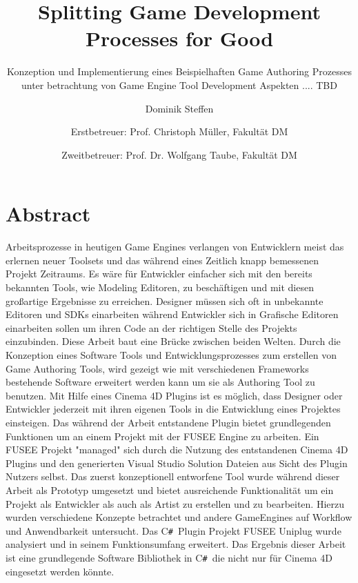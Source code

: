 \documentclass[pagesize, paper=a4, fontsize=12pt,titlepage=true, headings=small, headnosepline, abstractoff, liststotoc, nochapterprefix, plainheadsepline, twoside]{scrreprt}
\author{
Dominik Steffen \and
Erstbetreuer: Prof. Christoph Müller, Fakultät DM \and
Zweitbetreuer: Prof. Dr. Wolfgang Taube, Fakultät DM
}
\title{Splitting Game Development Processes for Good}
\subtitle{Konzeption und Implementierung eines Beispielhaften Game Authoring Prozesses unter betrachtung von Game Engine Tool Development Aspekten .... TBD}
\newcommand{\CSS}{C\texttt{\# }}
\begin{document}



\newpage
\thispagestyle{empty}
\mbox{}

\begingroup
\newpage
\pagestyle{empty}
\renewcommand*{\chapterpagestyle}{empty}
\chapter*{Abstract}%
Arbeitsprozesse in heutigen Game Engines verlangen von Entwicklern meist das erlernen neuer Toolsets und das während eines Zeitlich knapp bemessenen Projekt Zeitraums. Es wäre für Entwickler einfacher sich mit den bereits bekannten Tools, wie Modeling Editoren, zu beschäftigen und mit diesen großartige Ergebnisse zu erreichen. Designer müssen sich oft in unbekannte Editoren und SDKs einarbeiten während Entwickler sich in Grafische Editoren einarbeiten sollen um ihren Code an der richtigen Stelle des Projekts einzubinden.
Diese Arbeit baut eine Brücke zwischen beiden Welten. Durch die Konzeption eines Software Tools und Entwicklungsprozesses zum erstellen von Game Authoring Tools, wird gezeigt wie mit verschiedenen Frameworks bestehende Software erweitert werden kann um sie als Authoring Tool zu benutzen. Mit Hilfe eines Cinema 4D Plugins ist es möglich, dass Designer oder Entwickler jederzeit mit ihren eigenen Tools in die Entwicklung eines Projektes einsteigen. Das während der Arbeit entstandene Plugin bietet grundlegenden Funktionen um an einem Projekt mit der FUSEE Engine zu arbeiten. Ein FUSEE Projekt "managed" sich durch die Nutzung des entstandenen Cinema 4D Plugins und den generierten Visual Studio Solution Dateien aus Sicht des Plugin Nutzers selbst.
Das zuerst konzeptionell entworfene Tool wurde während dieser Arbeit als Prototyp umgesetzt und bietet ausreichende Funktionalität um ein Projekt als Entwickler als auch als Artist zu erstellen und zu bearbeiten. Hierzu wurden verschiedene Konzepte betrachtet und andere GameEngines auf Workflow und Anwendbarkeit untersucht. Das \CSS Plugin Projekt FUSEE Uniplug wurde analysiert und in seinem Funktionsumfang erweitert. Das Ergebnis dieser Arbeit ist eine grundlegende Software Bibliothek in \CSS die nicht nur für Cinema 4D eingesetzt werden könnte.
\end{document}
